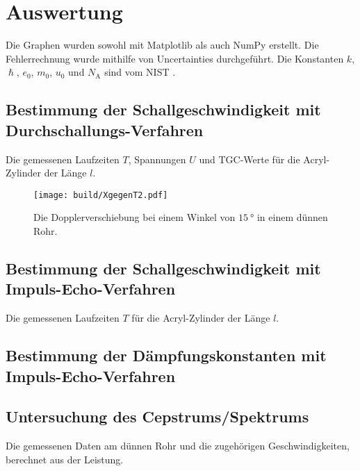 \section{Auswertung}
\label{sec:Auswertung}


Die Graphen wurden sowohl mit Matplotlib \cite{matplotlib} als auch NumPy \cite{numpy} erstellt. Die
Fehlerrechnung wurde mithilfe von Uncertainties \cite{uncertainties} durchgeführt.
Die Konstanten $k$, $\hslash$, $e_0$, $m_0$, $u_0$ und $N_\text{A}$ sind vom NIST \cite{nistgov}.

\subsection{Bestimmung der Schallgeschwindigkeit mit Durchschallungs-Verfahren}
\begin{table}
	\centering
	\caption{Die gemessenen Laufzeiten $T$, Spannungen $U$ und TGC-Werte für die Acryl-Zylinder der Länge $l$.}
	
\end{table}
\begin{figure}
	\centering
	\caption{Die Dopplerverschiebung bei einem Winkel von $\SI{15}{\degree}$ in einem dünnen Rohr.}
	\texttt{[image: build/XgegenT2.pdf]}
	\label{fig:k15}
\end{figure}


\subsection{Bestimmung der Schallgeschwindigkeit mit Impuls-Echo-Verfahren}
\begin{table}
	\centering
	\caption{Die gemessenen Laufzeiten $T$ für die Acryl-Zylinder der Länge $l$.}
	
\end{table}

\subsection{Bestimmung der Dämpfungskonstanten mit Impuls-Echo-Verfahren}


\subsection{Untersuchung des Cepstrums/Spektrums}
\begin{table}
	\centering
	\caption{Die gemessenen Daten am dünnen Rohr und die zugehörigen Geschwindigkeiten, berechnet aus der Leistung.}
	
\end{table}
